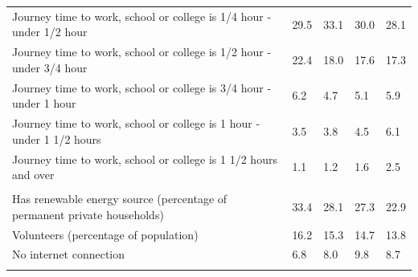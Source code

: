 \documentclass{article}
\begin{document}
\begin{table}[h]
\begin{tabular}{KTTTT}
Journey time to work, school or college is 1/4 hour - under 1/2 hour & 29.5& 33.1& 30.0& 28.1\\
Journey time to work, school or college is 1/2 hour - under 3/4 hour & 22.4& 18.0& 17.6& 17.3\\
Journey time to work, school or college is 3/4 hour - under 1 hour & 6.2& 4.7& 5.1& 5.9\\
Journey time to work, school or college is 1 hour - under 1 1/2 hours & 3.5& 3.8& 4.5& 6.1\\
Journey time to work, school or college is 1 1/2 hours and over & 1.1& 1.2& 1.6& 2.5\\
\hline
    \\ 
    \hline
Has renewable energy source (percentage of permanent private households) & 33.4& 28.1& 27.3& 22.9\\
    \hline
Volunteers (percentage of population) & 16.2& 15.3& 14.7& 13.8\\
    \hline
No internet connection& 6.8& 8.0& 9.8& 8.7\\
\hline
\end{tabular}
\end{table}
\end{document}
